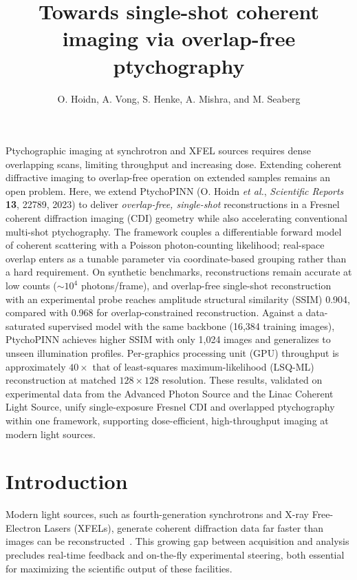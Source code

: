 \documentclass{optica-article}
\begin{document}
\title{Towards single-shot coherent imaging via overlap-free ptychography}

\author{O. Hoidn, A. Vong, S. Henke, A. Mishra, and M. Seaberg}
\address{SLAC National Accelerator Laboratory, Menlo Park, California 94025, USA\\
Argonne National Laboratory, Lemont, Illinois 60439, USA}

\begin{abstract*}
 Ptychographic imaging at synchrotron and XFEL sources requires dense overlapping scans, limiting throughput and increasing dose. Extending coherent diffractive imaging to overlap-free operation on extended samples remains an open problem. Here, we extend PtychoPINN (O. Hoidn \emph{et al.}, \emph{Scientific Reports} \textbf{13}, 22789, 2023) to deliver \emph{overlap-free, single-shot} reconstructions in a Fresnel coherent diffraction imaging (CDI) geometry while also accelerating conventional multi-shot ptychography. The framework couples a differentiable forward model of coherent scattering with a Poisson photon-counting likelihood; real-space overlap enters as a tunable parameter via coordinate-based grouping rather than a hard requirement. On synthetic benchmarks, reconstructions remain accurate at low counts ($\sim\!10^4$ photons/frame), and overlap-free single-shot reconstruction with an experimental probe reaches amplitude structural similarity (SSIM) 0.904, compared with 0.968 for overlap-constrained reconstruction. Against a data-saturated supervised model with the same backbone (16,384 training images), PtychoPINN achieves higher SSIM with only 1,024 images and generalizes to unseen illumination profiles. Per-graphics processing unit (GPU) throughput is approximately $40\times$ that of least-squares maximum-likelihood (LSQ-ML) reconstruction at matched $128\times128$ resolution. These results, validated on experimental data from the Advanced Photon Source and the Linac Coherent Light Source, unify single-exposure Fresnel CDI and overlapped ptychography within one framework, supporting dose-efficient, high-throughput imaging at modern light sources.

\end{abstract*}

\section{Introduction}\label{sec1}
Modern light sources, such as fourth-generation synchrotrons and X-ray Free-Electron Lasers (XFELs), generate coherent diffraction data far faster than images can be reconstructed~\cite{LCLSIIHE_DesignPerf}. This growing gap between acquisition and analysis precludes real-time feedback and on-the-fly experimental steering, both essential for maximizing the scientific output of these facilities.
\end{document}
